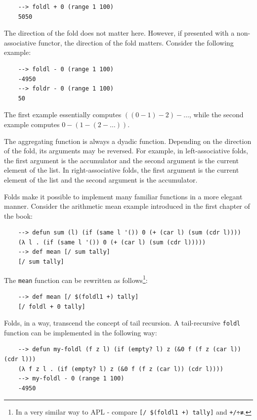 \begin{Verbatim}
    --> foldl + 0 (range 1 100)
    5050
\end{Verbatim}

The direction of the fold does not matter here. However, if presented with a non-associative functor, the direction of the fold matters. Consider the following example:

\begin{Verbatim}
    --> foldl - 0 (range 1 100)
    -4950
    --> foldr - 0 (range 1 100)
    50
\end{Verbatim}

The first example essentially computes $((0 - 1) - 2) - \dots$, while the second example computes $0 - (1 - (2 - \dots))$.

The aggregating function is always a dyadic function. Depending on the direction of the fold, its arguments may be reversed. For example, in left-associative folds, the first argument is the accumulator and the second argument is the current element of the list. In right-associative folds, the first argument is the current element of the list and the second argument is the accumulator.

Folds make it possible to implement many familiar functions in a more elegant manner. Consider the arithmetic mean example introduced in the first chapter of the book:

\begin{Verbatim}
    --> defun sum (l) (if (same l '()) 0 (+ (car l) (sum (cdr l))))
    (λ l . (if (same l '()) 0 (+ (car l) (sum (cdr l)))))
    --> def mean [/ sum tally]
    [/ sum tally]
\end{Verbatim}

The \verb|mean| function can be rewritten as follows\footnote{In a very similar way to APL - compare \verb|[/ $(foldl1 +) tally]| and \verb|+/÷≢|.}:

\begin{Verbatim}
    --> def mean [/ $(foldl1 +) tally]
    [/ foldl + 0 tally]
\end{Verbatim}

Folds, in a way, transcend the concept of tail recursion. A tail-recursive \verb|foldl| function can be implemented in the following way:

\begin{Verbatim}
    --> defun my-foldl (f z l) (if (empty? l) z (&0 f (f z (car l)) (cdr l)))
    (λ f z l . (if (empty? l) z (&0 f (f z (car l)) (cdr l))))
    --> my-foldl - 0 (range 1 100)
    -4950
\end{Verbatim}

